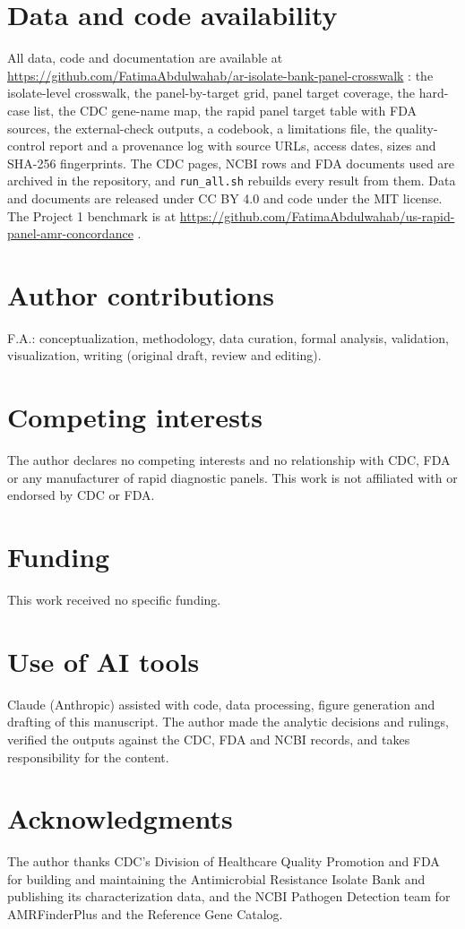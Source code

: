 \documentclass[10pt,twocolumn,letterpaper]{article}
\begin{document}
\section*{Data and code availability}
All data, code and documentation are available at
\url{https://github.com/FatimaAbdulwahab/ar-isolate-bank-panel-crosswalk} \cite{thiswork}: the isolate-level crosswalk,
the panel-by-target grid, panel target coverage, the hard-case list, the CDC gene-name map, the rapid panel target table
with FDA sources, the external-check outputs, a codebook, a limitations file, the quality-control report and a provenance
log with source URLs, access dates, sizes and SHA-256 fingerprints. The CDC pages, NCBI rows and FDA documents used are
archived in the repository, and \texttt{run\_all.sh} rebuilds every result from them. Data and documents are released under
CC BY 4.0 and code under the MIT license. The Project 1 benchmark is at
\url{https://github.com/FatimaAbdulwahab/us-rapid-panel-amr-concordance} \cite{project1}.

\section*{Author contributions}
F.A.: conceptualization, methodology, data curation, formal analysis, validation, visualization, writing (original draft,
review and editing).

\section*{Competing interests}
The author declares no competing interests and no relationship with CDC, FDA or any manufacturer of rapid diagnostic
panels. This work is not affiliated with or endorsed by CDC or FDA.

\section*{Funding}
This work received no specific funding.

\section*{Use of AI tools}
Claude (Anthropic) assisted with code, data processing, figure generation and drafting of this manuscript. The author
made the analytic decisions and rulings, verified the outputs against the CDC, FDA and NCBI records, and takes
responsibility for the content.

\section*{Acknowledgments}
The author thanks CDC's Division of Healthcare Quality Promotion and FDA for building and maintaining the Antimicrobial
Resistance Isolate Bank and publishing its characterization data, and the NCBI Pathogen Detection team for AMRFinderPlus
and the Reference Gene Catalog.

\small

\normalsize
\end{document}
